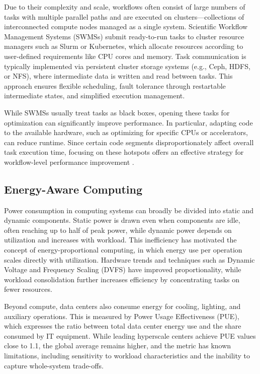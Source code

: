 Due to their complexity and scale, workflows often consist of large numbers of tasks with multiple parallel paths and are executed on clusters—collections of interconnected compute nodes managed as a single system. Scientific Workflow Management Systems (SWMSs) submit ready-to-run tasks to cluster resource managers such as Slurm or Kubernetes, which allocate resources according to user-defined requirements like CPU cores and memory. Task communication is typically implemented via persistent cluster storage systems (e.g., Ceph, HDFS, or NFS), where intermediate data is written and read between tasks. This approach ensures flexible scheduling, fault tolerance through restartable intermediate states, and simplified execution management.

While SWMSs usually treat tasks as black boxes, opening these tasks for optimization can significantly improve performance. In particular, adapting code to the available hardware, such as optimizing for specific CPUs or accelerators, can reduce runtime. Since certain code segments disproportionately affect overall task execution time, focusing on these hotspots offers an effective strategy for workflow-level performance improvement \cite{thamsen2025energyawareworkflowexecutionoverview}.



\subsection{Energy-Aware Computing}
\label{sec:background_energyawarecomputing}
\cite{thamsen2025energyawareworkflowexecutionoverview}
Power consumption in computing systems can broadly be divided into static and dynamic components. Static power is drawn even when components are idle, often reaching up to half of peak power, while dynamic power depends on utilization and increases with workload. This inefficiency has motivated the concept of energy-proportional computing, in which energy use per operation scales directly with utilization. Hardware trends and techniques such as Dynamic Voltage and Frequency Scaling (DVFS) have improved proportionality, while workload consolidation further increases efficiency by concentrating tasks on fewer resources.

Beyond compute, data centers also consume energy for cooling, lighting, and auxiliary operations. This is measured by Power Usage Effectiveness (PUE), which expresses the ratio between total data center energy use and the share consumed by IT equipment. While leading hyperscale centers achieve PUE values close to 1.1, the global average remains higher, and the metric has known limitations, including sensitivity to workload characteristics and the inability to capture whole-system trade-offs.

